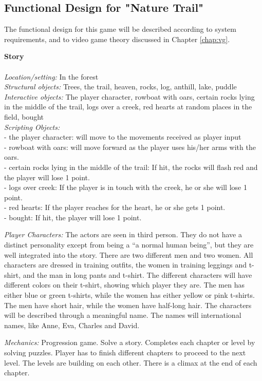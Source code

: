 \subsection{Functional Design for "Nature Trail"}
\label{subsec:designnature}
The functional design for this game will be described according to system requirements, and to video game theory discussed in Chapter \ref{chap:vg}.

\textbf{Story} \\ \\
\emph{Location/setting:} In the forest \\
\emph{Structural objects:} Trees, the trail, heaven, rocks, log, anthill, lake, puddle \\
\emph{Interactive objects:} The player character, rowboat with oars, certain rocks lying in the middle of the trail, logs over a creek, red hearts at random places in the field, bought \\
\emph{Scripting Objects:} \\
- the player character: will move to the movements received as player input\\
- rowboat with oars: will move forward as the player uses his/her arms with the oars. \\
- certain rocks lying in the middle of the trail: If hit, the rocks will flash red and the player will lose 1 point. \\
- logs over creek: If the player is in touch with the creek, he or she will lose 1 point. \\
- red hearts: If the player reaches for the heart, he or she gets 1 point. \\
- bought: If hit, the player will lose 1 point.

\emph{Player Characters:} The actors are seen in third person. They do not have a distinct personality except from being a “a normal human being”, but they are well integrated into the story. There are two different men and two women. All characters are dressed in training outfits, the women in training leggings and t-shirt, and the man in long pants and t-shirt. The different characters will have different colors on their t-shirt, showing which player they are. The men has either blue or green t-shirts, while the women has either yellow or pink t-shirts. The men have short hair, while the women have half-long hair. The characters will be described through a meaningful name. The names will international names, like Anne, Eva, Charles and David. 

\emph{Mechanics:} Progression game. Solve a story. Completes each chapter or level by solving puzzles. Player has to finish different chapters to proceed to the next level. The levels are building on each other. There is a climax at the end of each chapter. 

